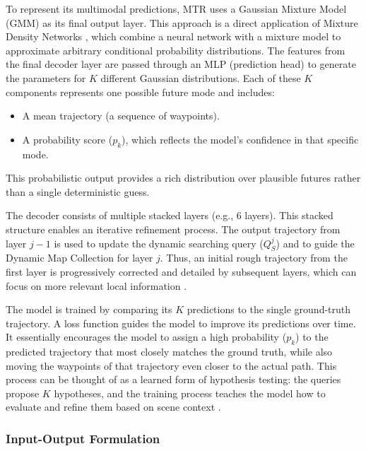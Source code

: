 To represent its multimodal predictions, MTR uses a Gaussian Mixture Model (GMM) as its final output layer. This approach is a direct application of Mixture Density Networks \cite{Bishop1994MDN}, which combine a neural network with a mixture model to approximate arbitrary conditional probability distributions. The features from the final decoder layer are passed through an MLP (prediction head) to generate the parameters for $K$ different Gaussian distributions. Each of these $K$ components represents one possible future mode and includes:
\begin{itemize}
    \item A mean trajectory (a sequence of waypoints).
    \item A probability score ($p_k$), which reflects the model's confidence in that specific mode.
\end{itemize}
This probabilistic output provides a rich distribution over plausible futures rather than a single deterministic guess.

The decoder consists of multiple stacked layers (e.g., 6 layers). This stacked structure enables an iterative refinement process. The output trajectory from layer $j-1$ is used to update the dynamic searching query ($Q_S^j$) and to guide the Dynamic Map Collection for layer $j$. Thus, an initial rough trajectory from the first layer is progressively corrected and detailed by subsequent layers, which can focus on more relevant local information \cite{Shi2022MTR}.

The model is trained by comparing its $K$ predictions to the single ground-truth trajectory. A loss function guides the model to improve its predictions over time. It essentially encourages the model to assign a high probability ($p_k$) to the predicted trajectory that most closely matches the ground truth, while also moving the waypoints of that trajectory even closer to the actual path. This process can be thought of as a learned form of hypothesis testing: the queries propose $K$ hypotheses, and the training process teaches the model how to evaluate and refine them based on scene context \cite{Shi2022MTR}.

\subsubsection{Input-Output Formulation}
\label{sec:model_mtr_io}

